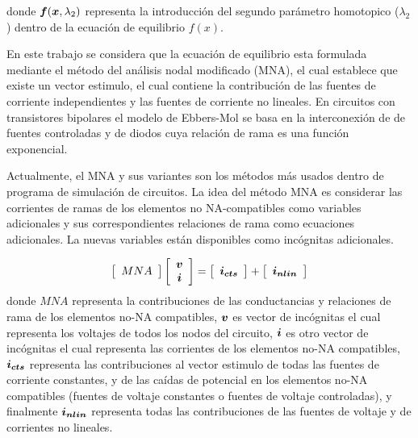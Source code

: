 \documentclass[conference,letterpaper,onecolumn]{IEEEtran}
\newcommand{\pig}[1]{\mbox{\boldmath ${#1}$}	}
\begin{document}
donde $\pig{f}(\pig{x},\lambda_2)$ representa la introducción del segundo parámetro homotopico ($\lambda_2$) dentro de la ecuación de
equilibrio $f(x)$.

En este trabajo se considera que la ecuación de equilibrio esta formulada mediante el método del análisis nodal modificado (MNA),
el cual establece que existe un vector estimulo, el cual contiene la contribución de  las fuentes de corriente independientes
y las fuentes de corriente no lineales. En circuitos con transistores bipolares el modelo de Ebbers-Mol se basa en la interconexi\'on de de fuentes controladas y de diodos cuya relación de rama es una función exponencial.

Actualmente, el MNA y sus variantes son los métodos m\'as usados dentro de programa de simulación
de circuitos.
La idea del método MNA es considerar las corrientes de ramas de los
elementos no NA-compatibles como variables adicionales y sus correspondientes
relaciones de rama como ecuaciones adicionales. La nuevas
variables están disponibles como incógnitas adicionales.

\begin{equation}
\left[ \begin{array}{c}
MNA
\end{array} \right]
\left[ \begin{array}{c}
\pig{v} \\
\pig{i} \\
\end{array} \right]
=
\left[ \begin{array}{c}
\pig{i_{cts}}
\end{array} \right]
+
\left[ \begin{array}{c}
\pig{i_{nlin}}
\end{array} \right]
\end{equation}
donde $MNA$ representa la contribuciones de las conductancias y relaciones de rama de los elementos no-NA compatibles,
$\pig{v}$  es vector de incógnitas el cual representa los voltajes de todos los nodos del circuito, $\pig{i}$ es otro vector de incógnitas el cual representa las corrientes de los elementos no-NA compatibles, $\pig{i_{cts}}$ representa las contribuciones
al vector estimulo de todas las fuentes de corriente constantes, y de las caídas de potencial en los elementos no-NA compatibles (fuentes de voltaje constantes o fuentes de voltaje controladas), y finalmente $\pig{i_{nlin}}$ representa todas las contribuciones de las fuentes de voltaje y de corrientes no lineales.
\end{document}
